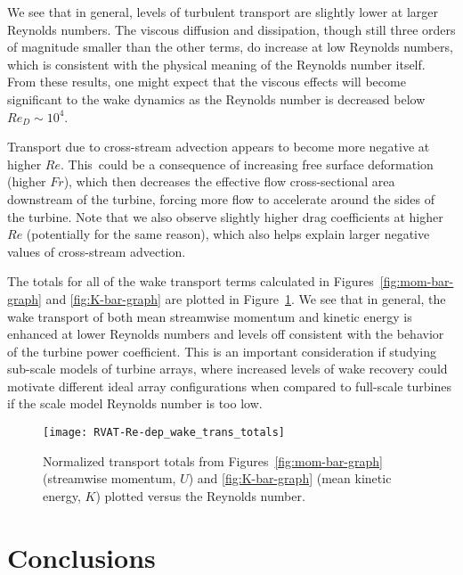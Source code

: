 We see that in general, levels of turbulent transport are slightly lower at
larger Reynolds numbers. The viscous diffusion and dissipation, though still
three orders of magnitude smaller than the other terms, do increase at low
Reynolds numbers, which is consistent with the physical meaning of the Reynolds
number itself. From these results, one might expect that the viscous effects
will become significant to the wake dynamics as the Reynolds number is decreased
below $Re_D \sim 10^4$.

Transport due to cross-stream advection appears to become more negative at
higher $Re$. This~could be a consequence of increasing free surface deformation
(higher $Fr$), which then decreases the effective flow cross-sectional area
downstream of the turbine, forcing more flow to accelerate around the sides of
the turbine. Note that we also observe slightly higher drag coefficients at
higher $Re$ (potentially for the same reason), which also helps explain larger
negative values of cross-stream advection.

The totals for all of the wake transport terms calculated in
Figures~\ref{fig:mom-bar-graph} and \ref{fig:K-bar-graph} are plotted in
Figure~\ref{fig:RVAT-Re-dep-wake-trans-totals}. We see that in general, the wake
transport of both mean streamwise momentum and kinetic energy is enhanced at
lower Reynolds numbers and levels off consistent with the behavior of the
turbine power coefficient. This is an important consideration if studying
sub-scale models of turbine arrays, where increased levels of wake recovery
could motivate different ideal array configurations when compared to full-scale
turbines if the scale model Reynolds number is too low.

\begin{figure}
    \centering
    
    \texttt{[image: RVAT-Re-dep\_wake\_trans\_totals]}
    
    \caption{Normalized transport totals from Figures~\ref{fig:mom-bar-graph}
        (streamwise momentum, $U$) and \ref{fig:K-bar-graph} (mean kinetic energy,
        $K$) plotted versus the Reynolds number.}
    
    \label{fig:RVAT-Re-dep-wake-trans-totals}
\end{figure}



\section{Conclusions}

